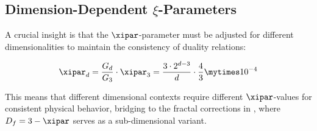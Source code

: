 	\begin{table}[htbp]
		\centering
		\caption{Geometric factors for various dimensionalities, extended with application examples}
		\label{tab:geometric_factors}
	\end{table}
	
	\subsection{Dimension-Dependent $\xi$-Parameters}
	\label{subsec:dimension_dependent_xi}
	
	A crucial insight is that the $\xipar$-parameter must be adjusted for different dimensionalities to maintain the consistency of duality relations:
	
	\begin{equation}
		\xipar_d = \frac{G_d}{G_3} \cdot \xipar_3 = \frac{3 \cdot 2^{d-3}}{d} \cdot \frac{4}{3} \mytimes 10^{-4}
	\end{equation}
	
	This means that different dimensional contexts require different $\xipar$-values for consistent physical behavior, bridging to the fractal corrections in \cite{T0_g2_erweiterung}, where $D_f = 3 - \xipar$ serves as a sub-dimensional variant.
	
